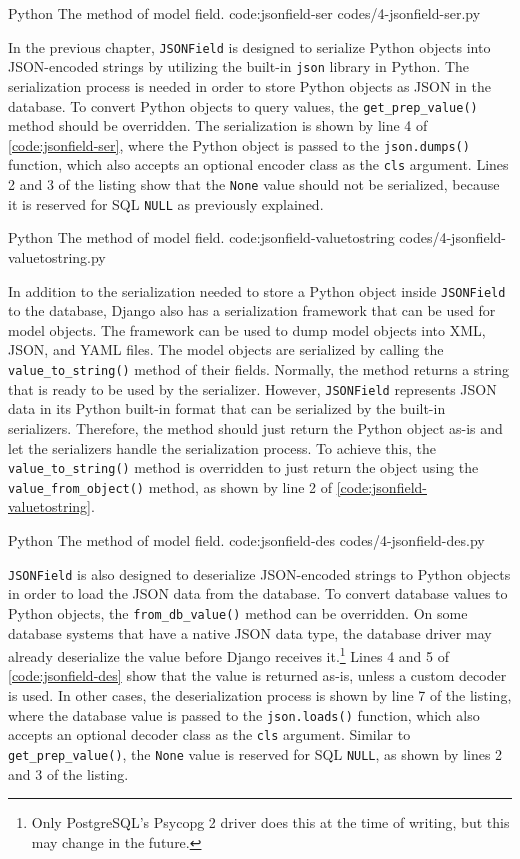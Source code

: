 \listing
{Python}
{The  method of  model field.}
{code:jsonfield-ser}
{codes/4-jsonfield-ser.py}

In the previous chapter, \verb|JSONField| is designed to serialize Python
objects into JSON-encoded strings by utilizing the built-in \verb|json| library
in Python. The serialization process is needed in order to store Python objects
as JSON in the database. To convert Python objects to query values, the
\verb|get_prep_value()| method should be overridden. The serialization is shown
by line 4 of \autoref{code:jsonfield-ser}, where the Python object is passed
to the \verb|json.dumps()| function, which also accepts an optional encoder
class as the \verb|cls| argument. Lines 2 and 3 of the listing show that the
\verb|None| value should not be serialized, because it is reserved for SQL
\verb|NULL| as previously explained.

\listing
{Python}
{The  method of  model field.}
{code:jsonfield-valuetostring}
{codes/4-jsonfield-valuetostring.py}

In addition to the serialization needed to store a Python object inside
\verb|JSONField| to the database, Django also has a serialization framework
that can be used for model objects. The framework can be used to dump model
objects into XML, JSON, and YAML files. The model objects are serialized by
calling the \verb|value_to_string()| method of their fields. Normally, the
method returns a string that is ready to be used by the serializer. However,
\verb|JSONField| represents JSON data in its Python built-in format that
can be serialized by the built-in serializers. Therefore, the method should
just return the Python object as-is and let the serializers handle the
serialization process. To achieve this, the \verb|value_to_string()| method
is overridden to just return the object using the \verb|value_from_object()|
method, as shown by line 2 of \autoref{code:jsonfield-valuetostring}.

\listing
{Python}
{The  method of  model field.}
{code:jsonfield-des}
{codes/4-jsonfield-des.py}

\verb|JSONField| is also designed to deserialize JSON-encoded strings to Python
objects in order to load the JSON data from the database. To convert database
values to Python objects, the \verb|from_db_value()| method can be overridden.
On some database systems that have a native JSON data type, the database driver
may already deserialize the value before Django receives it.\footnote{Only
PostgreSQL's Psycopg 2 driver does this at the time of writing, but this may
change in the future.} Lines 4 and 5 of \autoref{code:jsonfield-des} show that
the value is returned as-is, unless a custom decoder is used. In other cases,
the deserialization process is shown by line 7 of the listing, where
the database value is passed to the \verb|json.loads()| function, which also
accepts an optional decoder class as the \verb|cls| argument. Similar to
\verb|get_prep_value()|, the \verb|None| value is reserved for SQL \verb|NULL|,
as shown by lines 2 and 3 of the listing.

